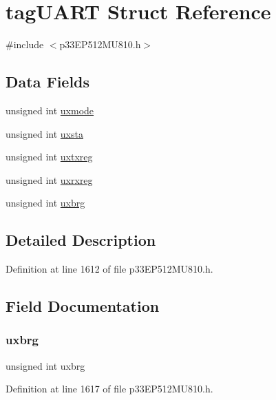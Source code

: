 \hypertarget{structtag_u_a_r_t}{}\section{tag\+U\+A\+RT Struct Reference}
\label{structtag_u_a_r_t}


{\ttfamily \#include $<$p33\+E\+P512\+M\+U810.\+h$>$}

\subsection*{Data Fields}
\begin{DoxyCompactItemize}
\item 
unsigned int \hyperlink{structtag_u_a_r_t_a298db6553023d427aad6ff60f3c3b00b}{uxmode}
\item 
unsigned int \hyperlink{structtag_u_a_r_t_a05f40b1f94adb34e7c268d0e2e21c951}{uxsta}
\item 
unsigned int \hyperlink{structtag_u_a_r_t_a0fbe38b0673ceec8294031c94f65cf3c}{uxtxreg}
\item 
unsigned int \hyperlink{structtag_u_a_r_t_af700a4d88899358a5ae718079b5ee3b9}{uxrxreg}
\item 
unsigned int \hyperlink{structtag_u_a_r_t_a4ace00c5603d7114f827d6834c8dff97}{uxbrg}
\end{DoxyCompactItemize}


\subsection{Detailed Description}


Definition at line 1612 of file p33\+E\+P512\+M\+U810.\+h.



\subsection{Field Documentation}
\mbox{\label{structtag_u_a_r_t_a4ace00c5603d7114f827d6834c8dff97}} 
\subsubsection{\texorpdfstring{uxbrg}{uxbrg}}
{\footnotesize\ttfamily unsigned int uxbrg}



Definition at line 1617 of file p33\+E\+P512\+M\+U810.\+h.

